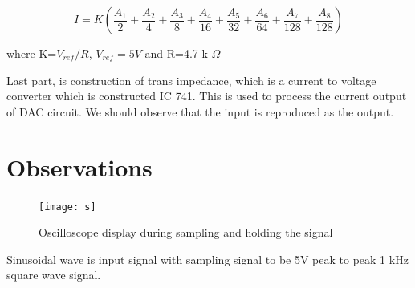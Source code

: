 \documentclass[a4paper, amsfonts, amssymb, amsmath, reprint, showkeys, nofootinbib, twoside]{revtex4-1}
\begin{document}
\begin{equation}
	I=K\left(\frac{A_1}{2}+\frac{A_2}{4}+\frac{A_3}{8}+\frac{A_4}{16}+\frac{A_5}{32}+\frac{A_6}{64}+\frac{A_7}{128}+\frac{A_8}{128}\right) 
\end{equation}

where K=$V_{ref}/{R}$, $V_{ref}=5 V$ and R=4.7 k $\Omega$

Last part, is construction of trans impedance, which is a current to voltage converter which is constructed IC 741. This is used to process the current output of DAC circuit. We should observe that the input is reproduced as the output. 

\section{Observations}
\begin{figure}[H]
	\centering
	\texttt{[image: s]} 
	\caption{Oscilloscope display during sampling and holding the signal}
	\label{s}
\end{figure}

Sinusoidal wave is input signal with sampling signal to be 5V peak to peak 1 kHz square wave signal. 
\end{document}

